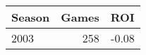 \begin{table}[t]
\centering
\small
\begin{tabular}{lrr}
\toprule
 \textbf{Season} & \textbf{Games} & \textbf{ROI} \\
\midrule
2003 & 258 & -0.08 \\
\bottomrule
\end{tabular}
\end{table}
